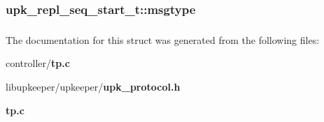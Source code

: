 \subsubsection[{msgtype}]{ {\bf upk\_\-repl\_\-seq\_\-start\_\-t::msgtype}}\label{structupk__repl__seq__start__t_a87cee031ee6f8f469959d587bee58d6b}
\subsubsection[{UPK\_\-V0\_\-UPK\_\-REPL\_\-SEQ\_\-START\_\-T\_\-FIELDS}]{}\label{structupk__repl__seq__start__t_ab32c1fd5691f8e19d59626fca34b01e9}


The documentation for this struct was generated from the following files:\begin{DoxyCompactItemize}
\item 
controller/{\bf tp.c}\item 
libupkeeper/upkeeper/{\bf upk\_\-protocol.h}\item 
{\bf tp.c}\end{DoxyCompactItemize}
